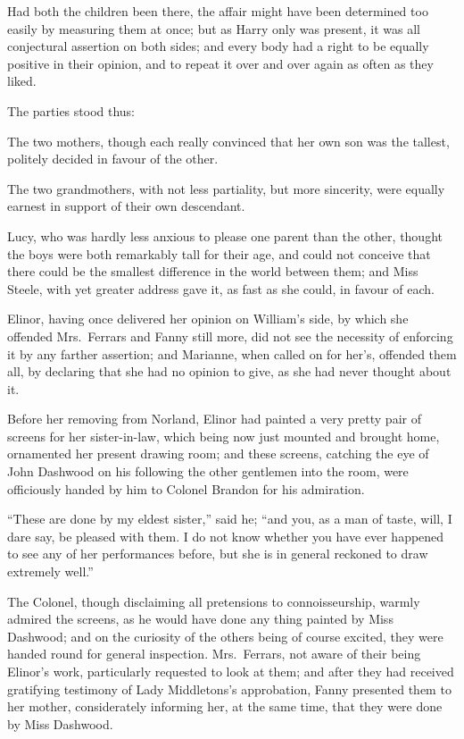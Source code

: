 \documentclass{article}
\begin{document}
Had both the children been there, the affair might
have been determined too easily by measuring them at once;
but as Harry only was present, it was all conjectural
assertion on both sides; and every body had a right to
be equally positive in their opinion, and to repeat it
over and over again as often as they liked.

The parties stood thus:

The two mothers, though each really convinced that
her own son was the tallest, politely decided in favour
of the other.

The two grandmothers, with not less partiality,
but more sincerity, were equally earnest in support
of their own descendant.

Lucy, who was hardly less anxious to please one parent
than the other, thought the boys were both remarkably tall
for their age, and could not conceive that there could
be the smallest difference in the world between them;
and Miss Steele, with yet greater address gave it,
as fast as she could, in favour of each.

Elinor, having once delivered her opinion on
William's side, by which she offended Mrs.\ Ferrars and
Fanny still more, did not see the necessity of enforcing
it by any farther assertion; and Marianne, when called
on for her's, offended them all, by declaring that she
had no opinion to give, as she had never thought about it.

Before her removing from Norland, Elinor had painted
a very pretty pair of screens for her sister-in-law,
which being now just mounted and brought home,
ornamented her present drawing room; and these screens,
catching the eye of John Dashwood on his following
the other gentlemen into the room, were officiously
handed by him to Colonel Brandon for his admiration.

``These are done by my eldest sister,'' said he; ``and you,
as a man of taste, will, I dare say, be pleased with them.
I do not know whether you have ever happened to see any
of her performances before, but she is in general reckoned
to draw extremely well.''

The Colonel, though disclaiming all pretensions
to connoisseurship, warmly admired the screens, as he
would have done any thing painted by Miss Dashwood;
and on the curiosity of the others being of course excited,
they were handed round for general inspection.
Mrs.\ Ferrars, not aware of their being Elinor's work,
particularly requested to look at them; and after they had
received gratifying testimony of Lady Middletons's approbation,
Fanny presented them to her mother, considerately informing
her, at the same time, that they were done by Miss Dashwood.
\end{document}
